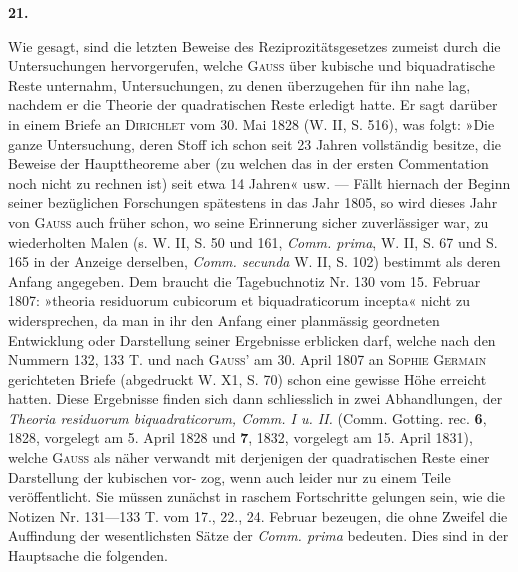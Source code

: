 \begin{center}\end{center}
\begin{center}\bfseries 21.\end{center}
\noindent\hspace*{\parindent}Wie gesagt, sind die letzten Beweise des Reziprozitätsgesetzes zumeist durch die Untersuchungen hervorgerufen, welche \textsc{Gauss} über kubische und biquadratische Reste unternahm, Untersuchungen, zu denen überzugehen für ihn nahe lag, nachdem er die Theorie der quadratischen Reste erledigt hatte. Er sagt darüber in einem Briefe an \textsc{Dirichlet} vom 30. Mai 1828 (W. II, S. 516), was folgt: »Die ganze Untersuchung, deren Stoff ich schon seit 23 Jahren vollständig besitze, die Beweise der Haupttheoreme aber (zu welchen das in der ersten Commentation noch nicht zu rechnen ist) seit etwa 14 Jahren« usw. — Fällt hiernach der Beginn seiner bezüglichen Forschungen spätestens in das Jahr 1805, so wird dieses Jahr von \textsc{Gauss} auch früher schon, wo seine Erinnerung sicher zuverlässiger war, zu wiederholten Malen (s. W. II, S. 50 und 161, \textit{Comm. prima}, W. II, S. 67 und S. 165 in der Anzeige derselben, \textit{Comm. secunda} W. II, S. 102) bestimmt als deren Anfang angegeben. Dem braucht die Tagebuchnotiz Nr. 130 vom 15. Februar 1807: »theoria residuorum cubicorum et biquadraticorum incepta« nicht zu widersprechen, da man in ihr den Anfang einer planmässig geordneten Entwicklung oder Darstellung seiner Ergebnisse erblicken darf, welche nach den Nummern 132, 133 T. und nach \textsc{Gauss}’ am 30. April 1807 an \textsc{Sophie Germain} gerichteten Briefe (abgedruckt W. X1, S. 70) schon eine gewisse Höhe erreicht hatten. Diese Ergebnisse finden sich dann schliesslich in zwei Abhandlungen, der \textit{Theoria residuorum biquadraticorum, Comm. I u. II.} (Comm. Gotting. rec. \textbf{6}, 1828, vorgelegt am 5. April 1828 und \textbf{7}, 1832, vorgelegt am 15. April 1831), welche \textsc{Gauss} als näher verwandt mit derjenigen der quadratischen Reste einer Darstellung der kubischen vor-
\newpage{}
\noindent zog, wenn auch leider nur zu einem Teile veröffentlicht. Sie müssen zunächst in raschem Fortschritte gelungen sein, wie die Notizen Nr. 131—133 T. vom 17., 22., 24. Februar bezeugen, die ohne Zweifel die Auffindung der wesentlichsten Sätze der \textit{Comm. prima} bedeuten. Dies sind in der Hauptsache die folgenden.

